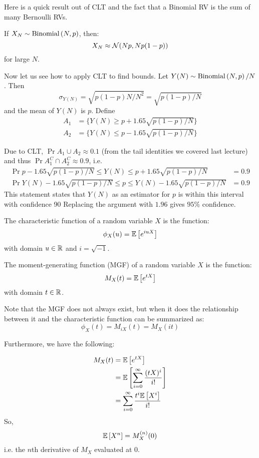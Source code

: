 Here is a quick result out of CLT and the fact that a Binomial RV is the sum of many Bernoulli RVs.

\begin{theorem}
    If $X_N \sim \text{Binomial}\left( N, p \right)$, then:
    \[ X_N \approx \mathcal{N}\qty(Np, Np(1- p)) \]
    for large $N$.
\end{theorem}

Now let us see how to apply CLT to find bounds. Let $Y(N) \sim \text{Binomial}\left( N, p \right)/N$. Then 
\[\sigma_{Y(N)} = \sqrt{p(1 - p)N/N^2} = \sqrt{p(1-p)/N}\] and
the mean of $Y(N)$ is $p$. Define
\begin{align*}
    A_1 &= \{ Y(N) \geq p + 1.65 \sqrt{p(1-p)/N} \} \\
    A_2 &= \{ Y(N) \leq p - 1.65 \sqrt{p(1-p)/N} \}
\end{align*}

Due to CLT, $\Pr{A_1 \cup A_2} \approx 0.1$ (from the tail identities we covered last lecture) and thus $\Pr{A_1^C \cap A_2^C} \approx 0.9$, i.e.
\begin{align*}
    \Pr{p - 1.65 \sqrt{p(1-p)/N} \leq Y(N) \leq p + 1.65 \sqrt{p(1-p)/N}} &= 0.9 \\
    \Pr{Y(N)- 1.65 \sqrt{p(1-p)/N} \leq p \leq Y(N) - 1.65 \sqrt{p(1-p)/N}} &= 0.9
\end{align*}
This statement states that $Y(N)$ as an estimator for $p$ is within this interval with confidence 90%
Replacing the argument with $1.96$ gives $95\%$ confidence.

\begin{definition}
    The characteristic function of a random variable $X$ is the function:
    \[ \phi_X(u) = \mathbb{E}\left[ e^{iuX} \right] \]
    with domain $u \in \operatorname{\mathbb{R}}$ and $i = \sqrt{-1}$.
\end{definition}

\begin{definition}
    The moment-generating function (MGF) of a random variable $X$ is the function:
    \[ M_X(t) = \mathbb{E}\left[ e^{tX} \right] \]
    with domain $t \in \operatorname{\mathbb{R}}$.
\end{definition}

Note that the MGF does not always exist, but when it does
the relationship between it and the characteristic function can be summarized as:
\[ \phi_X(t) = M_{iX}(t) = M_X(it) \]

Furthermore, we have the following:
\begin{note}
    \begin{align*}
        M_X(t) &= \mathbb{E}\left[ e^{tX} \right] \\
        &= \mathbb{E}\left[ \sum_{i = 0}^{\infty} \frac{(tX)^i}{i!} \right] \\
        &= \sum_{i = 0}^{\infty} \frac{t^i \mathbb{E}\left[ X^i \right]}{i!}
    \end{align*}
    So,
    \[ \mathbb{E}\left[ X^n \right] = M_X^{(n)} (0) \]
    i.e. the $n$th derivative of $M_X$ evaluated at 0.
\end{note}